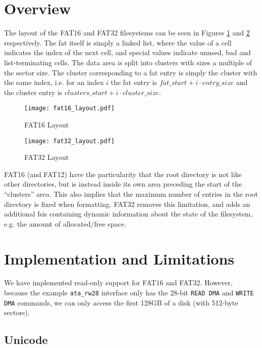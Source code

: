 \section{Overview}

The layout of the FAT16 and FAT32 filesystems can be seen in Figures
\ref{fig:fat16_layout} and \ref{fig:fat32_layout} respectively. The \ac{fat}
itself is simply a linked list, where the value of a cell indicates the index
of the next cell, and special values indicate unused, bad and list-terminating
cells.  The data area is split into clusters with sizes a multiple of the
sector size. The cluster corresponding to a \ac{fat} entry is simply the
cluster with the same index, i.e. for an index $i$ the \ac{fat} entry is
$fat\_start + i \cdot entry\_size$ and the cluster entry is $clusters\_start +
i \cdot cluster\_size$.

\begin{figure}[htb]
\centering
\texttt{[image: fat16\_layout.pdf]}
\caption{FAT16 Layout}
\label{fig:fat16_layout}
\end{figure}

\begin{figure}[htb]
\centering
\texttt{[image: fat32\_layout.pdf]}
\caption{FAT32 Layout}
\label{fig:fat32_layout}
\end{figure}

FAT16 (and FAT12) have the particularity that the root directory is not like
other directories, but is instead inside its own area preceding the start of
the ``clusters'' area. This also implies that the maximum number of entries in
the root directory is fixed when formatting. FAT32 removes this limitation, and
adds an additional \ac{fsis} containing dynamic information about the state of
the filesystem, e.g. the amount of allocated/free space.

\section{Implementation and Limitations}

We have implemented read-only support for FAT16 and FAT32. However, because the
example \lstinline+ata_rw28+ interface only has the 28-bit {\tt READ DMA} and
{\tt WRITE DMA} commands, we can only access the first 128GB of a disk (with
512-byte sectors).

\subsection{Unicode}

